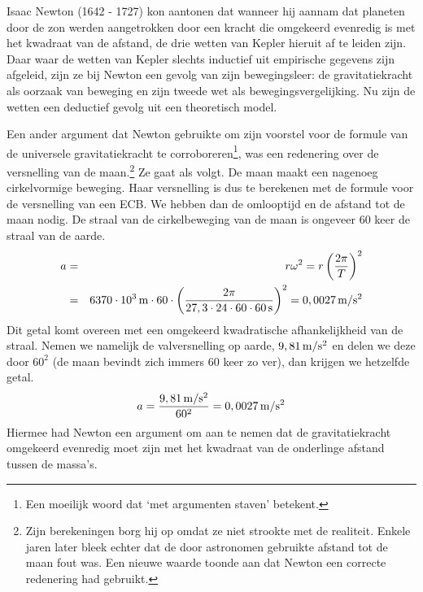 \documentclass{ximera}
\begin{document}
	\author{Bart Lambregs}
    \xmsource





	
	
	Isaac Newton (1642 - 1727) kon aantonen dat wanneer hij aannam dat planeten door de zon werden aangetrokken door een kracht die omgekeerd evenredig is met het kwadraat van de afstand, de drie wetten van Kepler hieruit af te leiden zijn. Daar waar de wetten van Kepler slechts inductief uit empirische gegevens zijn afgeleid, zijn ze bij Newton een gevolg van zijn bewegingsleer: de gravitatiekracht als oorzaak van beweging en zijn tweede wet als bewegingsvergelijking. Nu zijn de wetten een deductief gevolg uit een theoretisch model.
	
	Een ander argument dat Newton gebruikte om zijn voorstel voor de formule van de universele gravitatiekracht te corroboreren\footnote{Een moeilijk woord dat `met argumenten staven' betekent.}, was een redenering over de versnelling van de maan.\footnote{Zijn berekeningen borg hij op omdat ze niet strookte met de realiteit. Enkele jaren later bleek echter dat de door astronomen gebruikte afstand tot de maan fout was. Een nieuwe waarde toonde aan dat Newton een correcte redenering had gebruikt.} Ze gaat als volgt. De maan maakt een nagenoeg cirkelvormige beweging. Haar versnelling is dus te berekenen met de formule voor de versnelling van een ECB. We hebben dan de omlooptijd en de afstand tot de maan nodig. De straal van de cirkelbeweging van de maan is ongeveer 60 keer de straal van de aarde.
	\begin{eqnarray*}
		a&=&r\omega^2=r\left(\frac{2\pi}{T}\right)^2\\
		&=&6370\cdot10^3\rm\,m\cdot60\cdot\left(\frac{2\pi}{27,3\cdot24\cdot60\cdot60\rm\,s}\right)^2=0,0027\rm\,m/s^2
	\end{eqnarray*}
	Dit getal komt overeen met een omgekeerd kwadratische afhankelijkheid van de straal. Nemen we namelijk de valversnelling op aarde, $9,81\rm\,m/s^2$ en delen we deze door $60^2$ (de maan bevindt zich immers 60 keer zo ver), dan krijgen we hetzelfde getal.
	\begin{eqnarray*}
		a=\frac{9,81\rm\,m/s^2}{60^2}=0,0027\rm\,m/s^2
	\end{eqnarray*}
	Hiermee had Newton een argument om aan te nemen dat de gravitatiekracht omgekeerd evenredig moet zijn met het kwadraat van de onderlinge afstand tussen de massa's.
	
\end{document}
